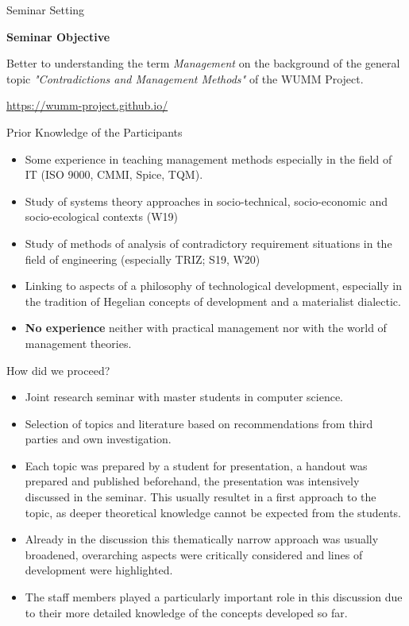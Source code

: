 \documentclass{beamer}
\title{Management and Cooperate Action\\[6pt]
  A Short Summary on our Seminar\\ at Leipzig University in S21
  \vskip1em}
\author{Prof. Dr. Hans-Gert Gräbe\\
\url{http://www.informatik.uni-leipzig.de/~graebe}}
\date{July 23, 2021}
\newcommand{\ueberschrift}[1]{\begin{center}\bf #1\end{center}}
\begin{document}
{
\begin{frame}
  \titlepage
\end{frame}}

\begin{frame}{Seminar Setting}

  \ueberschrift{Seminar Objective}

  Better to understanding the term \emph{Management} on the background of the
  general topic \emph{"Contradictions and Management Methods"} of the WUMM
  Project.

\url{https://wumm-project.github.io/}
\end{frame}

\begin{frame}{Prior Knowledge of the Participants}
\begin{itemize}
\item Some experience in teaching management methods especially in the field
  of IT (ISO 9000, CMMI, Spice, TQM).
\item Study of systems theory approaches in socio-technical, socio-economic
  and socio-ecological contexts (W19)
\item Study of methods of analysis of contradictory requirement situations in
  the field of engineering (especially TRIZ; S19, W20)
\item Linking to aspects of a philosophy of technological development,
  especially in the tradition of Hegelian concepts of development and a
  materialist dialectic.
\item \textbf{No experience} neither with practical management nor with
  the world of management theories.
\end{itemize}
\end{frame}

\begin{frame}{How did we proceed?} 
\begin{itemize}
\item Joint research seminar with master students in computer science.
\item Selection of topics and literature based on recommendations from third
  parties and own investigation.
\item Each topic was prepared by a student for presentation, a handout was
  prepared and published beforehand, the presentation was intensively
  discussed in the seminar. This usually resultet in a first approach to the
  topic, as deeper theoretical knowledge cannot be expected from the students.
\item Already in the discussion this thematically narrow approach was usually
  broadened, overarching aspects were critically considered and lines of
  development were highlighted. 
\item The staff members played a particularly important role in this
  discussion due to their more detailed knowledge of the concepts developed so
  far. 
\end{itemize}
\end{frame}
\end{document}
